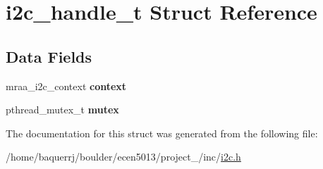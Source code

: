 \hypertarget{structi2c__handle__t}{}\section{i2c\+\_\+handle\+\_\+t Struct Reference}
\label{structi2c__handle__t}
\subsection*{Data Fields}
\begin{DoxyCompactItemize}
\item 
\mbox{\label{structi2c__handle__t_a8f4777fa5b67bd21154394e02c8736b9}} 
mraa\+\_\+i2c\+\_\+context {\bfseries context}
\item 
\mbox{\label{structi2c__handle__t_a45f120ca378c64243b43e3e74da7d9c2}} 
pthread\+\_\+mutex\+\_\+t {\bfseries mutex}
\end{DoxyCompactItemize}


The documentation for this struct was generated from the following file\+:\begin{DoxyCompactItemize}
\item 
/home/baquerrj/boulder/ecen5013/project\+\_/inc/\hyperlink{i2c_8h}{i2c.\+h}\end{DoxyCompactItemize}
